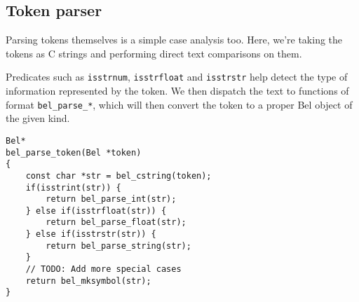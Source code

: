 \documentclass[openright,a4paper,twoside,12pt]{memoir}
\begin{document}
\subsection{Token parser}
\label{sec:orgc2f0589}

Parsing tokens themselves  is a simple case analysis  too. Here, we're
taking the tokens as C  strings and performing direct text comparisons
on them.

Predicates such as  \texttt{isstrnum}, \texttt{isstrfloat} and \texttt{isstrstr}  help detect the
type of  information represented  by the token.  We then  dispatch the
text to functions  of format \texttt{bel\_parse\_*}, which will  then convert the
token to a proper Bel object of the given kind.

\begin{verbatim}
Bel*
bel_parse_token(Bel *token)
{
    const char *str = bel_cstring(token);
    if(isstrint(str)) {
        return bel_parse_int(str);
    } else if(isstrfloat(str)) {
        return bel_parse_float(str);
    } else if(isstrstr(str)) {
        return bel_parse_string(str);
    }
    // TODO: Add more special cases
    return bel_mksymbol(str);
}
\end{verbatim}
\end{document}
